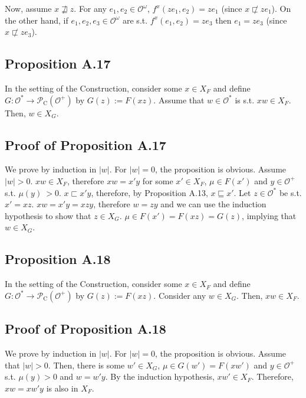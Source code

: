 \documentclass[a4paper]{article}
\newcommand{\Abs}[1]{\lvert #1 \rvert}
\newcommand{\Obs}{\mathcal{O}}
\newcommand{\ObsO}{\Obs^\omega}
\newcommand{\CC}{\mathcal{P}_{\operatorname{C}}}
\begin{document}
Now, assume ${x \not\sqsupseteq z}$. For any ${e_1,e_2 \in \ObsO}$, ${f^x(ze_1,e_2)=ze_1}$ (since ${x \not\sqsubset ze_1}$). On the other hand, if ${e_1,e_2,e_3 \in \ObsO}$ are s.t. ${f^x(e_1,e_2)=ze_3}$ then ${e_1 = ze_3}$ (since ${x \not\sqsubset ze_3}$).

\subsection{Proposition A.17}

In the setting of the Construction, consider some ${x \in X_F}$ and define ${G: \Obs^* \rightarrow \CC(\Obs^+)}$ by ${G(z):=F(xz)}$. Assume that ${w \in \Obs^*}$ is s.t. ${xw \in X_F}$. Then, ${w \in X_G}$.

\subsection{Proof of Proposition A.17}

We prove by induction in ${\Abs{w}}$. For ${\Abs{w}=0}$, the proposition is obvious. Assume ${\Abs{w} > 0}$. ${xw \in X_F}$, therefore ${xw=x'y}$ for some ${x' \in X_F}$, ${\mu \in F(x')}$ and ${y \in \Obs^+}$ s.t. ${\mu(y)\ > 0}$. ${x \sqsubset x'y}$, therefore, by Proposition A.13, ${x \sqsubseteq x'}$. Let ${z \in \Obs^*}$ be s.t. ${x' = xz}$. ${xw=x'y=xzy}$, therefore ${w=zy}$ and we can use the induction hypothesis to show that ${z \in X_G}$. ${\mu \in F(x') = F(xz)=G(z)}$, implying that ${w \in X_G}$.

\subsection{Proposition A.18}

In the setting of the Construction, consider some ${x \in X_F}$ and define ${G: \Obs^* \rightarrow \CC(\Obs^+)}$ by ${G(z):=F(xz)}$. Consider any ${w \in X_G}$. Then, ${xw \in X_F}$.

\subsection{Proof of Proposition A.18}

We prove by induction in ${\Abs{w}}$. For ${\Abs{w} = 0}$, the proposition is obvious. Assume that ${\Abs{w} > 0}$. Then, there is some ${w' \in X_G}$, ${\mu \in G(w')=F(xw')}$ and ${y \in \Obs^+}$ s.t. ${\mu(y) > 0}$ and ${w = w'y}$. By the induction hypothesis, ${xw' \in X_F}$. Therefore, ${xw=xw'y}$ is also in ${X_F}$.
\end{document}
